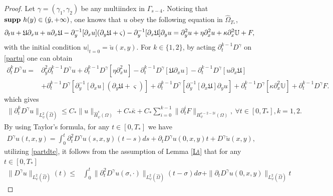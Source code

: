 \documentclass{amsart}
\numberwithin{equation}{section}
\begin{document}
\begin{proof}
Let $\gamma=(\gamma_{1},\gamma_{2})$ be any multiindex in $\Gamma_{s-4}$.
Noticing that ${\bf supp}~h(y)\in(\hat{y},+\infty)$, one knows that $u$ obey the following equation in $\hat{\Omega}_{T_{*}}$,
\begin{equation}\label{partu}
\partial_{t}u
+\mathfrak{U}\partial_{x}u+u\partial_{x}\mathfrak{U}
-\partial_{y}^{-1}[\partial_{x}u](\partial_{y}\mathfrak{U}+\varsigma)
-\partial_{y}^{-1}[\partial_{x}\mathfrak{U}]\partial_{y}u
=\partial_{y}^{2}u+\eta\partial_{x}^{2}u+\kappa\partial_{x}^{2}\mathbb{U}+F,\\
\end{equation}
with the initial condition $u|_{t=0}=\check{u}(x,y)$.
For $k\in\{1,2\}$, by acting $\partial_{t}^{k-1}D^{\gamma}$ on \eqref{partu} one can obtain
\begin{align}\label{partde}
\partial_{t}^{k}D^{\gamma}u
=& \partial_{y}^{2}\partial_{t}^{k-1}D^{\gamma}u
  +\partial_{t}^{k-1}D^{\gamma}[\eta\partial_{x}^{2}u]
  -\partial_{t}^{k-1}D^{\gamma}[\mathfrak{U}\partial_{x}u]
  -\partial_{t}^{k-1}D^{\gamma}[u\partial_{x}\mathfrak{U}]\\
 &+\partial_{t}^{k-1}D^{\gamma}[\partial_{y}^{-1}[\partial_{x}u](\partial_{y}\mathfrak{U}+\varsigma)]
  +\partial_{t}^{k-1}D^{\gamma}[\partial_{y}^{-1}[\partial_{x}\mathfrak{U}]\partial_{y}u]
  +\partial_{t}^{k-1}D^{\gamma}[\kappa\partial_{x}^{2}\mathbb{U}]
  +\partial_{t}^{k-1}D^{\gamma}F.\nonumber
\end{align}
which gives
\begin{align}\label{partdte}
\|\partial_{t}^{k}D^{\gamma}u\|_{L_{\psi}^{2}(\hat{\Omega})}
\leq C_{*}\|u\|_{\hat{H}_{\psi}^{s}(\Omega)}
    +C_{*}\bar{\kappa}
    +C_{*}\sum_{i=0}^{k-1}\|\partial_{t}^{i}F\|_{H_{\psi}^{s-2-2i}(\Omega)},~\forall t\in[0,T_{*}], k=1,2.
\end{align}
By using Taylor's formula, for any $t\in[0,T_{*}]$ we have
\begin{align*}
D^{\gamma}u(t,x,y)
= \int_{0}^{t}\partial_{t}^{2}D^{\gamma}u(s,x,y)(t-s)ds
 +\partial_{t}D^{\gamma}u(0,x,y)t
 +D^{\gamma}\check{u}(x,y),
\end{align*}
utilizing \eqref{partdte}, it follows from the assumption of Lemma \ref{Lt} that for any $t\in[0,T_{*}]$
\begin{align}\label{ltp'}
\|D^{\gamma}u\|_{L_{\psi}^{2}(\hat{\Omega})}(t)
\leq& \int_{0}^{t}\|\partial_{t}^{2}D^{\gamma}u(\sigma,\cdot)\|_{L_{\psi}^{2}(\hat{\Omega})}(t-\sigma)d\sigma
     +\|\partial_{t}D^{\gamma}u(0,x,y)\|_{L_{\psi}^{2}(\hat{\Omega})}t

\end{align}
\end{proof}
\end{document}
